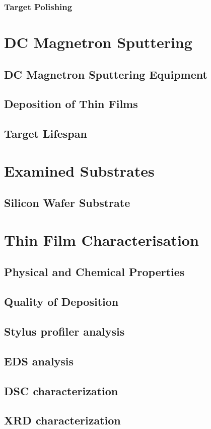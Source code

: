 \documentclass[a4paper,12pt,oneside]{report}%
\begin{document}
\subsubsection{Target Polishing}

\section{DC Magnetron Sputtering}

\subsection{DC Magnetron Sputtering Equipment}

\subsection{Deposition of Thin Films}

\subsection{Target Lifespan}

\section{Examined Substrates} 

\subsection{Silicon Wafer Substrate}

\section{Thin Film Characterisation}

\subsection{Physical and Chemical Properties}

\subsection{Quality of Deposition} 
 
\subsection{Stylus profiler analysis}

\subsection{EDS analysis}

\subsection{DSC characterization}

\subsection{XRD characterization}

\end{document}
